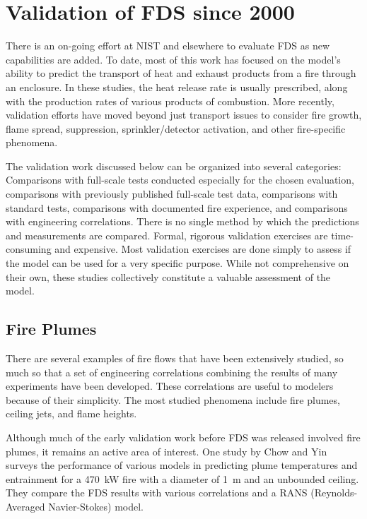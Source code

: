 \section{Validation of FDS since 2000}

There is an on-going effort at NIST and elsewhere to evaluate FDS as new capabilities are added. To date, most of this work has focused on the model's ability to predict the transport of heat and exhaust products from a fire through an enclosure. In these studies, the heat release rate is usually prescribed, along with the production rates of various products of combustion. More recently, validation efforts have moved beyond just transport issues to consider fire growth, flame spread, suppression, sprinkler/detector activation, and other fire-specific phenomena.

The validation work discussed below can be organized into several categories: Comparisons with full-scale tests conducted especially for the chosen evaluation,  comparisons  with previously  published full-scale test data, comparisons with standard tests, comparisons with documented fire experience, and comparisons with engineering correlations. There is no single method by which the predictions and measurements are compared.  Formal, rigorous validation exercises are time-consuming and expensive. Most validation exercises are done simply to assess if the model can be used for a very specific purpose. While not comprehensive on their own, these studies collectively constitute a valuable assessment of the model.



\subsection{Fire Plumes}

There are several examples of fire flows that have been extensively studied, so much so that a set of engineering correlations combining the results of  many experiments  have been  developed. These correlations are useful to modelers because of their simplicity. The most studied phenomena include fire plumes, ceiling jets, and flame heights.

Although much of the early validation work before FDS was released involved fire plumes, it remains an active area of interest. One study by Chow and Yin~\cite{Chow:1} surveys the performance of various models in predicting plume temperatures and entrainment for a 470~kW fire with a diameter of 1~m and an unbounded ceiling. They compare the FDS results with various correlations and a RANS (Reynolds-Averaged Navier-Stokes) model.

